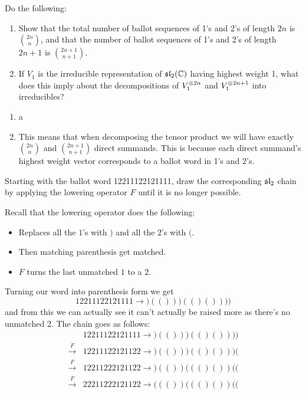 \documentclass[12pt]{memoir}
\begin{document}
\begin{Ej}
    Do the following:
    \begin{enumerate}
        \item Show that the total number of ballot sequences of 1's and 2's of length $2n$ is $\binom{2n}{n}$, and
        that the number of ballot sequences of 1's and 2's of length $2n + 1$ is $\binom{2n+1}{n+1}$.
        \item If $V_1$ is the irreducible representation of $\mathfrak{sl}_2(\mathbb{C})$ having highest weight 1, what does this
        imply about the decompositions of $V_1^{\otimes 2n}$ and $V_1^{\otimes 2n+1}$ into irreducibles?
    \end{enumerate}
\end{Ej}
\begin{ptcbr}
    \begin{enumerate}
        \item a
        \item This means that when decomposing the tensor product we will have exactly $\binom{2n}{n}$ and $\binom{2n+1}{n+1}$ direct summands. This is because each direct summand's highest weight vector corresponds to a ballot word in 1's and 2's.
    \end{enumerate}
\end{ptcbr}
\begin{Ej}
    Starting with the ballot word 12211122121111, draw the corresponding $\mathfrak{sl}_2$ chain by applying the lowering operator $F$ until it is no longer possible.
\end{Ej}

\begin{ptcbr}
    Recall that the lowering operator does the following:
    \begin{itemize}
        \item Replaces all the $1$'s with $)$ and all the $2$'s with $($.
        \item Then matching parenthesis get matched. 
        \item $F$ turns the last unmatched $1$ to a $2$.
    \end{itemize}
    Turning our word into parenthesis form we get
    $$12211122121111\to)(()))(()())))$$
    and from this we can actually see it can't actually be raised more as there's no unmatched $2$. The chain goes as follows:
    \begin{align*}
                       &12211122121111\to)(()))(()())))\\
        \xrightarrow{F}&12211122121122\to)(()))(()()))(\\
        \xrightarrow{F}&12211222121122\to)(())((()())((\\
        \xrightarrow{F}&22211222121122\to((())((()())((
    \end{align*}
\end{ptcbr}
\end{document}
